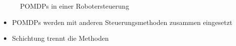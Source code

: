 \begin{itemize}
\begin{figure}[h!]
		\caption{POMDPs in einer Robotersteuerung}
		\label{fig:ch08_pomdpRobotersteuerung}
	\end{figure}
	\begin{itemize}
		\item POMDPs werden mit anderen Steuerungsmethoden zusammen eingesetzt
		\item Schichtung trennt die Methoden
	\end{itemize}
\end{itemize}